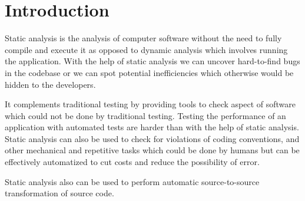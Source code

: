 \section{Introduction}
Static analysis is the analysis of computer software without the need to fully compile and execute it as opposed to dynamic analysis\cite{dynamic_analysis} which involves running the application. With the help of static analysis we can uncover hard-to-find bugs in the codebase or we can spot potential inefficiencies which otherwise would be hidden to the developers. \medskip 
\par It complements traditional testing by providing tools to check aspect of software which could not be done by traditional testing. Testing the performance of an application with automated tests are harder than with the help of static analysis. Static analysis can also be used to check for violations of coding conventions, and other mechanical and repetitive tasks which could be done by humans but can be effectively automatized to cut costs and reduce the possibility of error. \medskip 
\par Static analysis also can be used to perform automatic source-to-source transformation of source code.